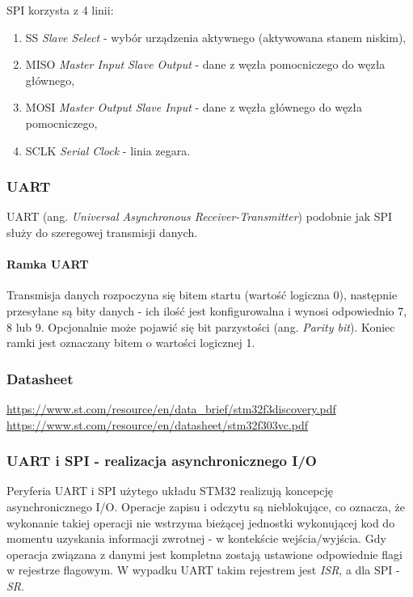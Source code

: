 \documentclass{article}
\begin{document}
SPI korzysta z 4 linii:
\begin{enumerate}
   \item SS \emph{Slave Select} - wybór urządzenia aktywnego (aktywowana stanem niskim),
   \item MISO \emph{Master Input Slave Output} - dane z węzła pomocniczego do węzła głównego,
   \item MOSI \emph{Master Output Slave Input} - dane z węzła głównego do węzła pomocniczego,
   \item SCLK \emph{Serial Clock} - linia zegara.
\end{enumerate}

\subsubsection{UART}
UART (ang. \emph{Universal Asynchronous Receiver-Transmitter}) podobnie jak SPI służy
do szeregowej transmisji danych.

\paragraph{Ramka UART}
Transmisja danych rozpoczyna się bitem startu (wartość logiczna 0), następnie przesyłane są
bity danych - ich ilość jest konfigurowalna i wynosi odpowiednio 7, 8 lub 9. Opcjonalnie
może pojawić się bit parzystości (ang. \emph{Parity bit}). Koniec ramki jest 
oznaczany bitem o wartości logicznej 1.

\subsubsection{Datasheet}
\url{https://www.st.com/resource/en/data_brief/stm32f3discovery.pdf}
\newline
\url{https://www.st.com/resource/en/datasheet/stm32f303vc.pdf}

\subsubsection{UART i SPI - realizacja asynchronicznego I/O}
Peryferia UART i SPI użytego układu STM32 realizują koncepcję
asynchronicznego I/O. Operacje zapisu i odczytu są nieblokujące, co oznacza, że
wykonanie takiej operacji nie wstrzyma bieżącej jednostki wykonującej kod do momentu
uzyskania informacji zwrotnej - w kontekście wejścia/wyjścia. Gdy operacja związana
z danymi jest kompletna zostają ustawione odpowiednie flagi w rejestrze flagowym.
W wypadku UART takim rejestrem jest \emph{ISR}, a dla SPI - \emph{SR}.
\end{document}
